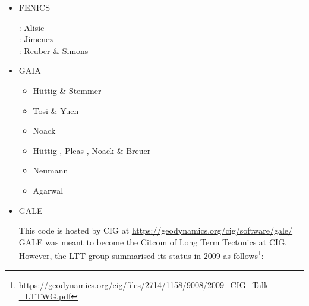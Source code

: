 \begin{itemize}
\item {\codefont FENICS} 

\begin{scriptsize}
\noindent
\twothousandfourteen: Alisic \etal \cite{alrk14}\\
\twothousandseventeen: Jimenez \etal \cite{jidb17}\\
\twothousandtwenty: Reuber \& Simons \cite{resi20}
\end{scriptsize}


\item {\codefont GAIA} 

\begin{scriptsize}
\begin{itemize}
\item[\twothousandeight] H{\"u}ttig \& Stemmer \cite{hust08b} 
\item[\twothousandeleven] Tosi \& Yuen \cite{toyu11} 
\item[\twothousandtwelve] Noack \etal \cite{nobs12}
\item[\twothousandthirteen] H{\"u}ttig \etal \cite{hutm13}, Pleas \etal \cite{plth13}, 
                            Noack \& Breuer \cite{nobr13} 
\item[\twothousandnineteen] Neumann \cite{neum19}
\item[\twothousandtwenty] Agarwal \etal \cite{agtb20}
\end{itemize}
\end{scriptsize}

\item {\codefont GALE} 

This code is hosted by CIG at \url{https://geodynamics.org/cig/software/gale/}
GALE was meant to become the Citcom of Long Term Tectonics at CIG. However, 
the LTT group summarised its status in 2009 as 
follows\footnote{\url{https://geodynamics.org/cig/files/2714/1158/9008/2009_CIG_Talk_-_LTTWG.pdf}}:


\end{itemize}
